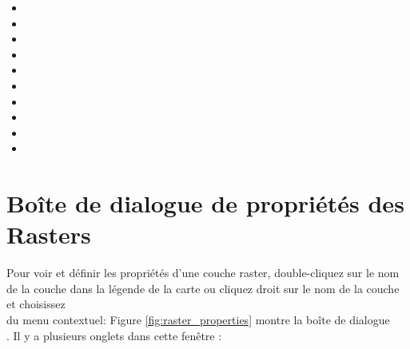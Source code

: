 \begin{itemize}[label=--]
\item {}
\item {}
\item {}
\item {}
\item {}
\item {}
\item {}
\item {}
\item {}
\item {}
\end{itemize}

\section{Boîte de dialogue de propriétés des Rasters}\label{label_rasterprop}

Pour voir et définir les propriétés d'une couche raster, double-cliquez sur le nom de la couche dans la légende de la carte ou cliquez droit sur le nom de la couche et choisissez\\  du menu
contextuel:  Figure
\ref{fig:raster_properties} montre la boîte de dialogue\\ . Il y a plusieurs onglets dans cette fenêtre :

